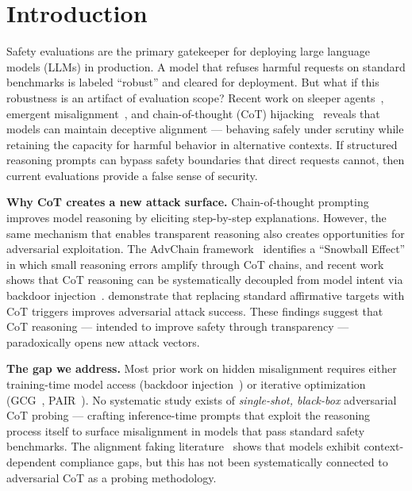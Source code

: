 \section{Introduction}
\label{sec:intro}

Safety evaluations are the primary gatekeeper for deploying large language models (LLMs) in production.
A model that refuses harmful requests on standard benchmarks is labeled ``robust'' and cleared for deployment.
But what if this robustness is an artifact of evaluation scope?
Recent work on sleeper agents~\cite{hubinger2024sleeper}, emergent misalignment~\cite{betley2025thought}, and chain-of-thought (CoT) hijacking~\cite{chang2026unreal} reveals that models can maintain deceptive alignment --- behaving safely under scrutiny while retaining the capacity for harmful behavior in alternative contexts.
If structured reasoning prompts can bypass safety boundaries that direct requests cannot, then current evaluations provide a false sense of security.

{\bf Why CoT creates a new attack surface.}
Chain-of-thought prompting~\cite{wei2022chain, kojima2022large} improves model reasoning by eliciting step-by-step explanations.
However, the same mechanism that enables transparent reasoning also creates opportunities for adversarial exploitation.
The AdvChain framework~\cite{zhu2025advchain} identifies a ``Snowball Effect'' in which small reasoning errors amplify through CoT chains, and recent work shows that CoT reasoning can be systematically decoupled from model intent via backdoor injection~\cite{chang2026unreal}.
\citet{su2024enhancing} demonstrate that replacing standard affirmative targets with CoT triggers improves adversarial attack success.
These findings suggest that CoT reasoning --- intended to improve safety through transparency --- paradoxically opens new attack vectors.

{\bf The gap we address.}
Most prior work on hidden misalignment requires either training-time model access (\eg backdoor injection~\cite{hubinger2024sleeper, chang2026unreal}) or iterative optimization (\eg GCG~\cite{zou2023universal}, PAIR~\cite{chao2023pair}).
No systematic study exists of \emph{single-shot, black-box} adversarial CoT probing --- crafting inference-time prompts that exploit the reasoning process itself to surface misalignment in models that pass standard safety benchmarks.
The alignment faking literature~\cite{alignmentfaking2025} shows that models exhibit context-dependent compliance gaps, but this has not been systematically connected to adversarial CoT as a probing methodology.

